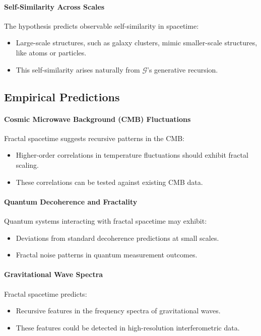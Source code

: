 \documentclass[12pt]{article}
\begin{document}
\paragraph{Self-Similarity Across Scales}
The hypothesis predicts observable self-similarity in spacetime:
\begin{itemize}
    \item Large-scale structures, such as galaxy clusters, mimic smaller-scale structures, like atoms or particles.
    \item This self-similarity arises naturally from \(\mathcal{G}\)’s generative recursion.
\end{itemize}

\subsection{Empirical Predictions}

\paragraph{Cosmic Microwave Background (CMB) Fluctuations}
Fractal spacetime suggests recursive patterns in the CMB:
\begin{itemize}
    \item Higher-order correlations in temperature fluctuations should exhibit fractal scaling.
    \item These correlations can be tested against existing CMB data.
\end{itemize}

\paragraph{Quantum Decoherence and Fractality}
Quantum systems interacting with fractal spacetime may exhibit:
\begin{itemize}
    \item Deviations from standard decoherence predictions at small scales.
    \item Fractal noise patterns in quantum measurement outcomes.
\end{itemize}

\paragraph{Gravitational Wave Spectra}
Fractal spacetime predicts:
\begin{itemize}
    \item Recursive features in the frequency spectra of gravitational waves.
    \item These features could be detected in high-resolution interferometric data.
\end{itemize}
\end{document}

